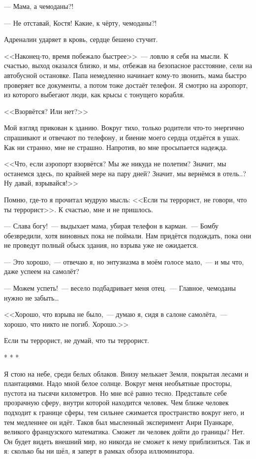 \documentclass[openany, oneside]{book}
\begin{document}
--- Мама, а чемоданы?!

--- Не отставай, Костя! Какие, к чёрту, чемоданы?!

Адреналин ударяет в кровь, сердце бешено стучит.

<<Наконец-то, время побежало быстрее>>~--- ловлю я себя на мысли. К счастью, выход оказался близко, и мы, отбежав на безопасное расстояние, сели на автобусной остановке. Папа немедленно начинает кому-то звонить, мама быстро проверяет все документы, а потом тоже достаёт телефон. Я смотрю на аэропорт, из которого выбегают люди, как крысы с тонущего корабля.

<<Взорвётся? Или нет?>>

Мой взгляд прикован к зданию. Вокруг тихо, только родители что-то энергично спрашивают и отвечают по телефону, и биение моего сердца отдаётся в ушах. Как ни странно, мне не страшно. Напротив, во мне просыпается надежда.

<<Что, если аэропорт взорвётся? Мы же никуда не полетим? Значит, мы останемся здесь, по крайней мере на пару дней? Значит, мы вернёмся в отель..? Ну давай, взрывайся!>>

Помню, где-то я прочитал мудрую мысль: <<Если ты террорист, не говори, что ты террорист>>. К счастью, мне и не пришлось.

--- Слава богу!~--- выдыхает мама, убирая телефон в карман.~--- Бомбу обезвредили, хотя виновных пока не поймали. Нам придётся подождать, пока они не проведут полный обыск здания, но взрыва уже не ожидается.

--- Это хорошо,~--- отвечаю я, но энтузиазма в моём голосе мало,~--- и мы что, даже успеем на самолёт?

--- Можем успеть!~--- весело подбадривает меня отец.~--- Главное, чемоданы нужно не забыть\dots

<<Хорошо, что взрыва не было,~--- думаю я, сидя в салоне самолёта,~--- хорошо, что никто не погиб. Хорошо.>>

Если ты террорист, не думай, что ты террорист.

\begin{center}
    * * *
\end{center}

Я стою на небе, среди белых облаков. Внизу мелькает Земля, покрытая лесами и плантациями. Надо мной белое солнце. Вокруг меня необъятные просторы, пустота на тысячи километров. Но мне всё равно тесно. Представьте себе прозрачную сферу, внутри которой находится человек. Чем ближе человек подходит к границе сферы, тем сильнее сжимается пространство вокруг него, и тем медленнее он идёт. Таков был мысленный эксперимент Анри Пуанкаре, великого французского математика. Сможет ли человек дойти до границы? Нет. Он будет видеть внешний мир, но никогда не сможет к нему приблизиться. Так и я: сколько бы ни шёл, я заперт в рамках обзора иллюминатора.
\end{document}
